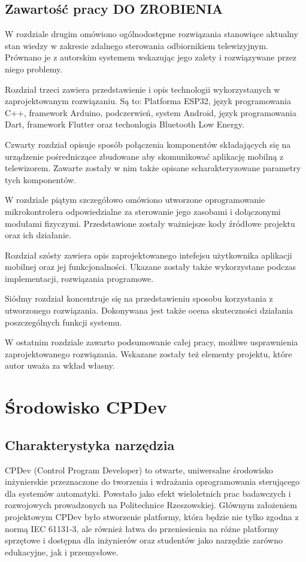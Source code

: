 \documentclass[12pt,twoside]{article}
\begin{document}
\subsection{Zawartość pracy DO ZROBIENIA}
W rozdziale drugim  omówiono ogólnodostępne rozwiązania stanowiące aktualny stan wiedzy w zakresie zdalnego sterowania odbiornikiem telewizyjnym. Prównano je z autorskim systemem wskazując jego zalety i rozwiązywane przez niego problemy.

Rozdział trzeci zawiera przedstawienie i opis technologii wykorzystanych w zaprojektowanym rozwiązaniu. Są to: Platforma ESP32, język programowania C++, framework Arduino, podczerwień, system Android, język programowania Dart, framework Flutter oraz techonlogia Bluetooth Low Energy.

Czwarty rozdział opisuje sposób połączenia komponentów składających się na urządzenie pośredniczące zbudowane aby skomunikować aplikację mobilną z telewizorem. Zawarte zostały w nim także opisane scharakteryzowane parametry tych komponentów.

W rozdziale piątym szczegółowo omówiono utworzone oprogramowanie mikrokontrolera odpowiedzialne za sterowanie jego zasobami i dołączonymi modułami fizyczymi. Przedstawione zostały ważniejsze kody źródłowe projektu oraz ich działanie.

Rozdział szósty zawiera opis zaprojektowanego intefejsu użytkownika aplikacji mobilnej oraz jej funkcjonalności. Ukazane zostały także wykorzystane podczas implementacji, rozwiązania programowe.

Siódmy rozdział koncentruje się na przedstawieniu sposobu korzystania z utworzonego rozwiązania. Dokonywana jest także ocena skuteczności działania poszczególnych funkcji systemu.

W ostatnim rozdziale zawarto podsumowanie całej pracy, możliwe usprawnienia zaprojektowanego rozwiązania. Wskazane zostały też elementy projektu, które autor uważa za wkład własny.


\clearpage
\section{Środowisko CPDev}
\subsection{Charakterystyka narzędzia}
CPDev (Control Program Developer) to otwarte, uniwersalne środowisko inżynierskie przeznaczone do tworzenia i wdrażania oprogramowania sterującego dla systemów automatyki. Powstało jako efekt wieloletnich prac badawczych i rozwojowych prowadzonych na Politechnice Rzeszowskiej. Głównym założeniem projektowym CPDev było stworzenie platformy, która będzie nie tylko zgodna z normą IEC 61131-3, ale również łatwa do przeniesienia na różne platformy sprzętowe i dostępna dla inżynierów oraz studentów jako narzędzie zarówno edukacyjne, jak i przemysłowe.
\end{document}
